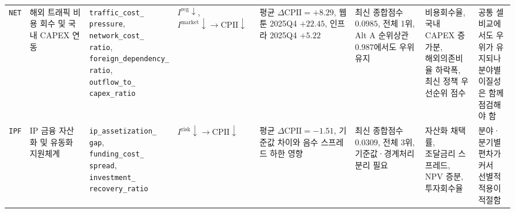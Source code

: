 \documentclass[11pt,a4paper]{report}
\begin{document}
\begin{landscape}
\begin{longtable}{@{}L{1.0cm}L{2.6cm}L{3.0cm}L{2.7cm}L{3.1cm}L{3.0cm}L{3.3cm}L{3.0cm}@{}}
\texttt{NET} & 해외 트래픽 비용 회수 및 국내 CAPEX 연동 & \parbox[t]{\linewidth}{\raggedright \texttt{traffic\_cost\_}\\\texttt{pressure},\\\texttt{network\_cost\_}\\\texttt{ratio},\\\texttt{foreign\_dependency\_}\\\texttt{ratio},\\\texttt{outflow\_to\_}\\\texttt{capex\_ratio}} & $I^{\mathrm{reg}} \downarrow$, $I^{\mathrm{market}} \downarrow \rightarrow \mathrm{CPII}\downarrow$ & \parbox[t]{\linewidth}{\raggedright 평균 $\Delta \mathrm{CPII}=+8.29$,\\웹툰 2025Q4 $+22.45$,\\인프라 2025Q4 $+5.22$} & \parbox[t]{\linewidth}{\raggedright 최신 종합점수 $0.0985$,\\전체 1위,\\Alt A 순위상관 $0.987$에서도 우위 유지} & \parbox[t]{\linewidth}{\raggedright 비용회수율, 국내 CAPEX 증가분,\\해외의존비율 하락폭,\\최신 정책 우선순위 점수} & \parbox[t]{\linewidth}{\raggedright 공통 셀 비교에서도 우위가 유지되나\\분야별 이질성은 함께 점검해야 함} \\
\texttt{IPF} & IP 금융 자산화 및 유동화 지원체계 & \parbox[t]{\linewidth}{\raggedright \texttt{ip\_assetization\_}\\\texttt{gap},\\\texttt{funding\_cost\_}\\\texttt{spread},\\\texttt{investment\_}\\\texttt{recovery\_ratio}} & $I^{\mathrm{risk}} \downarrow \rightarrow \mathrm{CPII}\downarrow$ & \parbox[t]{\linewidth}{\raggedright 평균 $\Delta \mathrm{CPII}=-1.51$,\\기준값 차이와\\음수 스프레드 하한 영향} & \parbox[t]{\linewidth}{\raggedright 최신 종합점수 $0.0309$,\\전체 3위,\\기준값·경계처리 분리 필요} & \parbox[t]{\linewidth}{\raggedright 자산화 채택률,\\조달금리 스프레드,\\NPV 증분, 투자회수율} & \parbox[t]{\linewidth}{\raggedright 분야·분기별 편차가 커서\\선별적 적용이 적절함} \\

\end{longtable}
\end{landscape}
\end{document}
